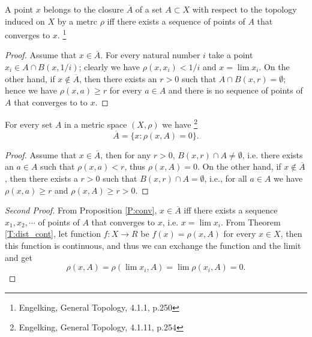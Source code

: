 \begin{proposition} \label{P:conv}
A point $x$ belongs to the closure $\overline{A}$ of a set $A\subset X$ with respect
to the topology induced on $X$ by a metrc $\rho$ iff there exists a sequence of
points of $A$ that converges to $x$.
\footnote{Engelking, General Topology, 4.1.1, p.250}
\end{proposition}
\begin{proof}
Assume that $x\in \overline{A}$. For every natural number $i$ take a point 
$x_i\in A\cap B(x,1/i)$; clearly we have $\rho(x,x_i)<1/i$ and $x=\lim{x_i}$.
On the other hand, if $x\notin \overline{A}$, then there exists an $r>0$ such that
$A\cap B(x,r)=\emptyset$; hence we have $\rho(x,a)\ge r$ for every $a\in A$ and
there is no sequence of points of $A$ that converges to to $x$.
\end{proof}




\begin{corollary} \label{C:closure_m}
For every set $A$ in a metric space $(X,\rho)$ we have
\footnote{Engelking, General Topology, 4.1.11, p.254}
\[
  \overline{A} = \{ x: \rho(x,A)=0  \}.
\]
\end{corollary}
\begin{proof}
Assume that $x\in\overline{A}$, then for any $r>0$, $B(x,r)\cap A\neq\emptyset$, i.e.
there exists an $a\in A$ such that $\rho(x,a)<r$, thus $\rho(x,A)=0$. On the
other hand, if $x\notin \overline{A}$, then there exists a $r>0$ such that
$B(x,r)\cap A=\emptyset$, i.e., for all $a\in A$ we have $\rho(x,a)\ge r$ and
$\rho(x,A)\ge r>0$.
\end{proof}
\begin{proof}[Second Proof]
From Proposition \ref{P:conv}, $x\in \overline{A}$ iff there exists a sequence
$x_1,x_2,\cdots$ of points of $A$ that converges to $x$, i.e. $x=\lim{x_i}$.
From Theorem \ref{T:dist_cont}, let function $f:X\to R$ be 
$f(x)=\rho(x,A)$ for every $x\in X$, then this function is continuous,
and thus we can exchange the function and the limit and get
\[
  \rho(x,A)=\rho(\lim{x_i},A)=\lim\rho(x_i,A)=0.
\]
\end{proof}


